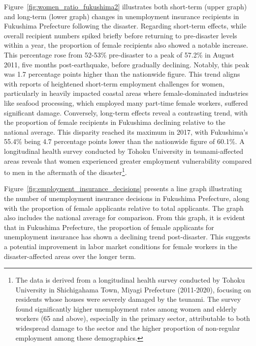 \documentclass[a4paper,12pt]{article}
\begin{document}
Figure~\ref{fig:women_ratio_fukushima2} illustrates both short-term (upper graph) and long-term (lower graph) changes in unemployment insurance recipients in Fukushima Prefecture following the disaster. Regarding short-term effects, while overall recipient numbers spiked briefly before returning to pre-disaster levels within a year, the proportion of female recipients also showed a notable increase. This percentage rose from 52-53\% pre-disaster to a peak of 57.2\% in August 2011, five months post-earthquake, before gradually declining. Notably, this peak was 1.7 percentage points higher than the nationwide figure. This trend aligns with reports of heightened short-term employment challenges for women, particularly in heavily impacted coastal areas where female-dominated industries like seafood processing, which employed many part-time female workers, suffered significant damage. Conversely, long-term effects reveal a contrasting trend, with the proportion of female recipients in Fukushima declining relative to the national average. This disparity reached its maximum in 2017, with Fukushima's 55.4\% being 4.7 percentage points lower than the nationwide figure of 60.1\%. A longitudinal health survey conducted by Tohoku University in tsunami-affected areas reveals that women experienced greater employment vulnerability compared to men in the aftermath of the disaster\footnote{The data is derived from a longitudinal health survey conducted by Tohoku University in Shichigahama Town, Miyagi Prefecture (2011-2020), focusing on residents whose houses were severely damaged by the tsunami. The survey found significantly higher unemployment rates among women and elderly workers (65 and above), especially in the primary sector, attributable to both widespread damage to the sector and the higher proportion of non-regular employment among these demographics.}.

Figure~\ref{fig:employment_insurance_decisions} presents a line graph illustrating the number of unemployment insurance decisions in Fukushima Prefecture, along with the proportion of female applicants relative to total applicants. The graph also includes the national average for comparison. From this graph, it is evident that in Fukushima Prefecture, the proportion of female applicants for unemployment insurance has shown a declining trend post-disaster. This suggests a potential improvement in labor market conditions for female workers in the disaster-affected areas over the longer term.
\end{document}
